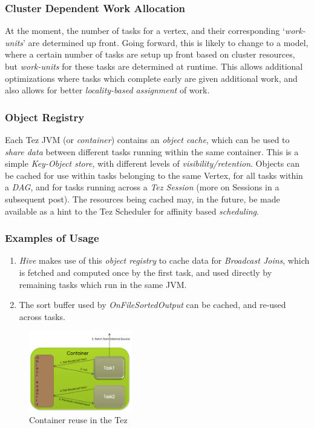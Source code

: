 \documentclass[twocolumn]{article}
\newcommand{\be}{\begin{enumerate}}
\newcommand{\ee}{\end{enumerate}}
\newcommand{\ii}{\item}
\begin{document}
\subsubsection*{Cluster Dependent Work Allocation}

At the moment, the number of tasks for a vertex, and their corresponding
`\emph{work-units}' are determined up front. Going forward, this is
likely to change to a model, where a certain number of tasks are setup
up front based on cluster resources, but \emph{work-units} for these
tasks are determined at runtime. This allows additional optimizations
where tasks which complete early are given additional work, and also
allows for better \emph{locality-based assignment} of work.

\subsubsection*{Object Registry}

Each Tez JVM (or \emph{container}) contains an \emph{object cache},
which can be used to \emph{share data} between different tasks running
within the same container. This is a simple \emph{Key-Object store},
with different levels of \emph{visibility/retention}. Objects can be
cached for use within tasks belonging to the same Vertex, for all tasks
within a \emph{DAG}, and for tasks running across a \emph{Tez
Session} (more on Sessions in a subsequent post). The resources being
cached may, in the future, be made available as a hint to the Tez
Scheduler for affinity based \emph{scheduling}.

\subsubsection*{Examples of Usage}

\be
\ii \emph{Hive} makes use of this \emph{object registry} to cache data
for \emph{Broadcast Joins}, which is fetched and computed once by the
first task, and used directly by remaining tasks which run in the same
JVM.
\ii The sort buffer used by \emph{OnFileSortedOutput} can be cached,
and re-used across tasks.
\ee

\begin{figure}[htb]
        \centering
        \includegraphics[width=0.4\textwidth]{tez121}
        \caption{Container reuse in the Tez}
        \label{fig16}
\end{figure}
\end{document}

